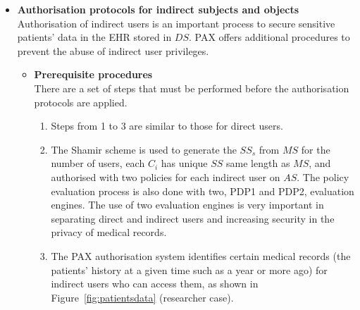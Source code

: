 \documentclass[journal,article,submit,moreauthors,pdftex]{Definitions/mdpi}
\begin{document}
\begin{itemize}
\begin{itemize}[topsep=0pt,itemsep=-1ex,partopsep=1ex,parsep=1ex]
\begin{itemize} [topsep=0pt,itemsep=-1ex,partopsep=1ex,parsep=1ex]
\begin{enumerate}
\begin{figure}[t]
	\caption{Protocol of PAX model between $AS$, $CS$ and $C_i$.}
	\label{fig:pax_as_cs_ci}
\end{figure}
\end{enumerate}
\end{itemize}
\item \textbf{Authorisation protocols for indirect subjects and objects}\\
Authorisation of indirect users is an important process to secure sensitive patients' data 
in the EHR stored in $DS$. PAX offers additional procedures to prevent the abuse of indirect 
user privileges.
\begin{itemize}[topsep=0pt,itemsep=-1ex,partopsep=1ex,parsep=1ex]
\item \textbf{Prerequisite procedures}\\
There are a set of steps that must be performed before the authorisation protocols are applied.
\begin{enumerate}
\item Steps from 1 to 3 are similar to those for direct users.
\item The Shamir scheme is used to generate the $SS_s$ from $MS$ for the number of users, each $C_i$ has unique $SS$ same length as $MS$, and authorised with two policies for each indirect user on $AS$. The policy evaluation process is also done with two, PDP1 and PDP2, evaluation engines. The use of two evaluation engines is very important in separating direct and indirect users and increasing security in the privacy of medical records.
\item The PAX authorisation system identifies certain medical records (the patients' history at a given time such as a year or more ago) for indirect users who can access them, as shown in Figure~\ref{fig:patientsdata} (researcher case).

\end{enumerate}
\end{itemize}
\end{itemize}
\end{itemize}
\end{document}

